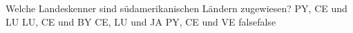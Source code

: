     {Welche Landeskenner sind südamerikanischen Ländern zugewiesen?}
    {PY, CE und LU}
    {LU, CE und BY}
    {CE, LU und JA}
    {PY, CE und VE}
    {false}{false}